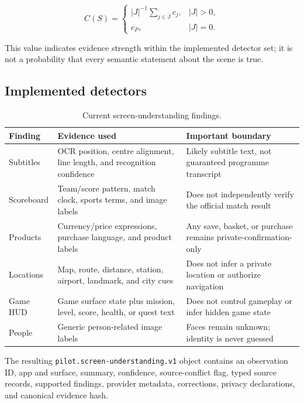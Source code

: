 \documentclass[11pt,a4paper]{article}
\begin{document}
\begin{equation}
 C(S)=
 \begin{cases}
  |J|^{-1}\sum_{j\in J}c_j, & |J|>0,\\
  c_P, & |J|=0.
 \end{cases}
\end{equation}

This value indicates evidence strength within the implemented detector set; it
is not a probability that every semantic statement about the scene is true.

\subsection{Implemented detectors}

\begin{table}[htbp]
\centering
\small
\caption{Current screen-understanding findings.}
\begin{tabularx}{\textwidth}{@{}L{28mm}Y Y@{}}
\toprule
Finding & Evidence used & Important boundary\\
\midrule
Subtitles & OCR position, centre alignment, line length, and recognition
confidence & Likely subtitle text, not guaranteed programme transcript\\
Scoreboard & Team/score pattern, match clock, sports terms, and image labels &
Does not independently verify the official match result\\
Products & Currency/price expressions, purchase language, and product labels &
Any save, basket, or purchase remains private-confirmation-only\\
Locations & Map, route, distance, station, airport, landmark, and city cues &
Does not infer a private location or authorize navigation\\
Game HUD & Game surface state plus mission, level, score, health, or quest text &
Does not control gameplay or infer hidden game state\\
People & Generic person-related image labels & Faces remain unknown; identity is
never guessed\\
\bottomrule
\end{tabularx}
\end{table}

The resulting \texttt{pilot.screen-understanding.v1} object contains an
observation ID, app and surface, summary, confidence, source-conflict flag,
typed source records, supported findings, provider metadata, corrections,
privacy declarations, and canonical evidence hash.
\end{document}
